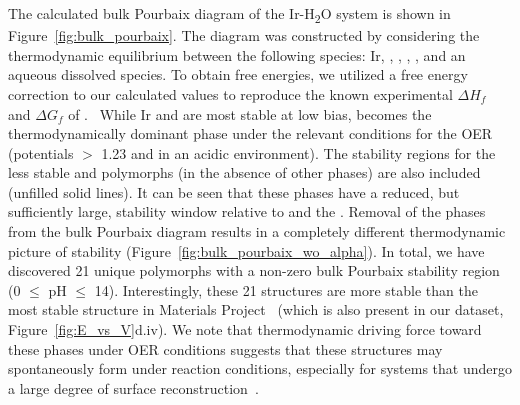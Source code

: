 %
%
The calculated bulk Pourbaix diagram of the Ir-H\textsubscript{2}O system is shown in Figure~\ref{fig:bulk_pourbaix}.
%
The diagram was constructed by considering the thermodynamic equilibrium between the following species: Ir, \rIrOtwo, \aIrOthree, \rIrOthree, \bIrOthree, and an aqueous dissolved \IrOfourm species.
%
%
To obtain free energies, we utilized a free energy correction to our calculated values to reproduce the known experimental $\Delta H_f$ and $\Delta G_f$ of \rIrOtwo.~\cite{Barin1995}
%
While Ir and \rIrOtwo are most stable at low bias, \aIrOthree becomes the thermodynamically dominant phase under the relevant conditions for the OER (potentials $>$ \num{1.23} \VRHE and in an acidic environment).
%
The stability regions for the less stable \bIrOthree and \rIrOthree polymorphs (in the absence of other \IrOthree phases) are also included (unfilled solid lines).
%
It can be seen that these phases have a reduced, but sufficiently large, stability window relative to \IrOtwo and the \IrOfourm.
%
Removal of the \IrOthree phases from the bulk Pourbaix diagram results in a completely different thermodynamic picture of \IrOtwo stability (Figure~\ref{fig:bulk_pourbaix_wo_alpha}).
In total, we have discovered 21 unique \IrOthree polymorphs with a non-zero bulk Pourbaix stability region
(0 $\leq$ pH $\leq$ 14).
%
Interestingly, these 21 structures are more stable than the most stable \IrOthree structure in Materials Project~\cite{mp-1097041} (which is also present in our dataset, Figure~\ref{fig:E_vs_V}d.iv).
%
We note that thermodynamic driving force toward these \IrOthree phases under OER conditions suggests that these structures may spontaneously form under reaction conditions,
especially for systems that undergo a large degree of surface reconstruction~\cite{Seitz2016}.


